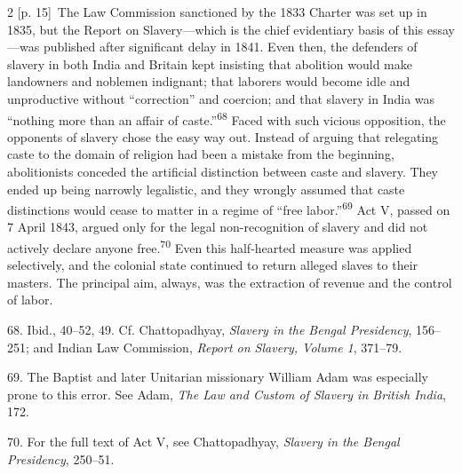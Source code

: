 \documentclass[10pt,a4paper]{article}
\begin{document}
\begin{paracol}{2}
\switchcolumn
{\scriptsize\color{gray} [p. 15]}\ The Law Commission sanctioned by the 1833 Charter was set up in 1835, but the Report on Slavery—which is the chief evidentiary basis of this essay—was published after significant delay in 1841. Even then, the defenders of slavery in both India and Britain kept insisting that abolition would make landowners and noblemen indignant; that laborers would become idle and unproductive without “correction” and coercion; and that slavery in India was “nothing more than an affair of caste.”\nobreak\textsuperscript{68} Faced with such vicious opposition, the opponents of slavery chose the easy way out. Instead of arguing that relegating caste to the domain of religion had been a mistake from the beginning, abolitionists conceded the artificial distinction between caste and slavery. They ended up being narrowly legalistic, and they wrongly assumed that caste distinctions would cease to matter in a regime of “free labor.”\nobreak\textsuperscript{69} Act V, passed on 7 April 1843, argued only for the legal non-recognition of slavery and did not actively declare anyone free.\nobreak\textsuperscript{70} Even this half-hearted measure was applied selectively, and the colonial state continued to return alleged slaves to their masters. The principal aim, always, was the extraction of revenue and the control of labor.\par{\small 68. Ibid., 40–52, 49. Cf. Chattopadhyay, \textit{Slavery in the Bengal Presidency}, 156–251; and Indian Law Commission, \textit{Report on Slavery, Volume 1}, 371–79.\par}{\small 69. The Baptist and later Unitarian missionary William Adam was especially prone to this error. See Adam, \textit{The Law and Custom of Slavery in British India}, 172.\par}{\small 70. For the full text of Act V, see Chattopadhyay, \textit{Slavery in the Bengal Presidency}, 250–51.\par}
\switchcolumn*

\end{paracol}
\end{document}
